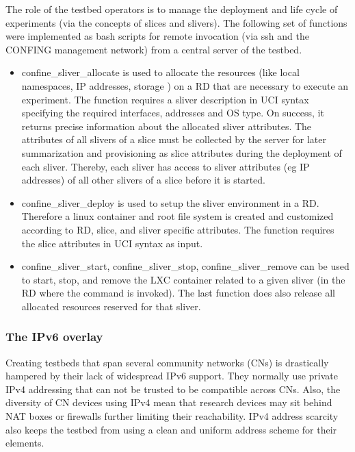 \documentclass[conference]{IEEEtran}
\begin{document}
The role of the testbed operators is to manage the deployment and life
cycle of experiments (via the concepts of slices and slivers). The
following set of functions were implemented as bash scripts for remote
invocation (via ssh and the CONFING management network) from a central
server of the testbed.
\begin{itemize}
\item confine\_sliver\_allocate is used to allocate the resources
  (like local namespaces, IP addresses, storage ) on a RD that are
  necessary to execute an experiment. The function requires a sliver
  description in UCI syntax specifying the required interfaces,
  addresses and OS type. On success, it returns precise information
  about the allocated sliver attributes. The attributes of all slivers
  of a slice must be collected by the server for later summarization
  and provisioning as slice attributes during the deployment of each
  sliver. Thereby, each sliver has access to sliver attributes (eg IP
  addresses) of all other slivers of a slice before it is started.
\item confine\_sliver\_deploy is used to setup the sliver environment
  in a RD. Therefore a linux container and root file system is created
  and customized according to RD, slice, and sliver specific
  attributes.  The function requires the slice attributes in UCI
  syntax as input.
\item confine\_sliver\_start, confine\_sliver\_stop,
  confine\_sliver\_remove can be used to start, stop, and remove the
  LXC container related to a given sliver (in the RD where the command
  is invoked). The last function does also release all allocated
  resources reserved for that sliver.

\end{itemize}





\subsubsection{The IPv6 overlay}

Creating testbeds that span several community networks (CNs) is drastically
hampered by their lack of widespread IPv6 support.  They normally use private
IPv4 addressing that
can not be trusted to be compatible across CNs.  Also,
the diversity of CN devices using IPv4 mean that research devices may sit
behind NAT boxes or firewalls further limiting their reachability.  IPv4
address scarcity also keeps the testbed from using a clean and uniform
address scheme for their elements.
\end{document}
